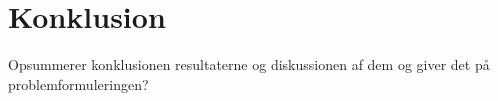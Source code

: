 \chapter{Konklusion}
Opsummerer konklusionen resultaterne og diskussionen af dem og giver det på problemformuleringen? \\